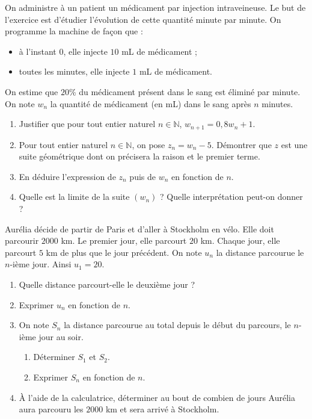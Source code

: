 \documentclass[11pt]{article}
\begin{document}
\begin{exo}
  On administre à un patient un médicament par injection intraveineuse. Le but
  de l'exercice est d'étudier l'évolution de cette quantité minute par minute.
  On programme la machine de façon que :
  \begin{itemize}
    \item à l'instant $0$, elle injecte $10$ mL de médicament ;
    \item toutes les minutes, elle injecte $1$ mL de médicament.
  \end{itemize}
  On estime que $20$\% du médicament présent dans le sang est éliminé par
  minute. On note $w_n$ la quantité de médicament (en mL) dans le sang après $n$
  minutes.
  \begin{enumerate}
    \item Justifier que pour tout entier naturel $n\in\mathbb{N}$, $w_{n+1} =
      0,8w_n+1$.
    \item Pour tout entier naturel $n\in\mathbb{N}$, on pose $z_n=w_n-5$.
      Démontrer que $z$ est une suite géométrique dont on précisera la raison et
      le premier terme.
    \item En déduire l'expression de $z_n$ puis de $w_n$ en fonction de $n$.
    \item Quelle est la limite de la suite $\left( w_n \right)$ ? Quelle
      interprétation peut-on donner ?
  \end{enumerate}
\end{exo}

\begin{exo}
  Aurélia décide de partir de Paris et d'aller à Stockholm en vélo. Elle doit
  parcourir $2000$ km. Le premier jour, elle parcourt $20$ km. Chaque jour, elle
  parcourt $5$ km de plus que le jour précédent. On note $u_n$ la distance
  parcourue le $n$-ième jour. Ainsi $u_1=20$.
  \begin{enumerate}
    \item Quelle distance parcourt-elle le deuxième jour ?
    \item Exprimer $u_n$ en fonction de $n$.
    \item On note $S_n$ la distance parcourue au total depuis le début du
      parcours, le $n$-ième jour au soir.
      \begin{enumerate}
        \item Déterminer $S_1$ et $S_2$.
        \item Exprimer $S_n$ en fonction de $n$.
      \end{enumerate}
    \item À l'aide de la calculatrice, déterminer au bout de combien de jours
      Aurélia aura parcouru les $2000$ km et sera arrivé à Stockholm.
  \end{enumerate}
\end{exo}
\end{document}
